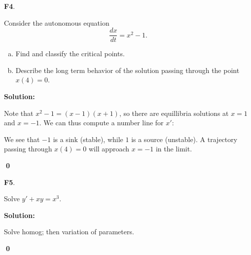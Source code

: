 \documentclass{article}
\newenvironment{problem}[1]
{
  \begin{flushleft}
  \textbf{#1}.
  \ignorespaces
}
{
  \end{flushleft}
}
\newenvironment{solution}
{
  \ignorespaces
  \textbf{Solution:}
}
{
  \ignorespacesafterend
  \begin{flushright}
  {\bfseries \qed}
  \end{flushright}
}
\begin{document}
\begin{problem}{F4}
Consider the autonomous equation 
\[\frac{dx}{dt} = x^2-1.\]  
\begin{enumerate}[(a)]
\item Find and classify the critical points.
\item Describe the long term behavior of the solution passing through the point \( x(4)=0 \).
\end{enumerate}
\end{problem}
\begin{solution}

Note that \(x^2-1=(x-1)(x+1)\), so there are equillibria solutions at \(x=1\) and \(x=-1\).  We can thus compute a number line for \(x'\):

\begin{center}
\end{center}

We see that \(-1\) is a sink (stable), while \(1\) is a source (unstable).  A trajectory passing through \(x(4)=0\) will approach \(x=-1\) in the limit.
\end{solution}

\begin{problem}{F5}
Solve \(y'+xy=x^3\).
\end{problem}
\begin{solution}
Solve homog; then variation of parameters.
\end{solution}
\end{document}
